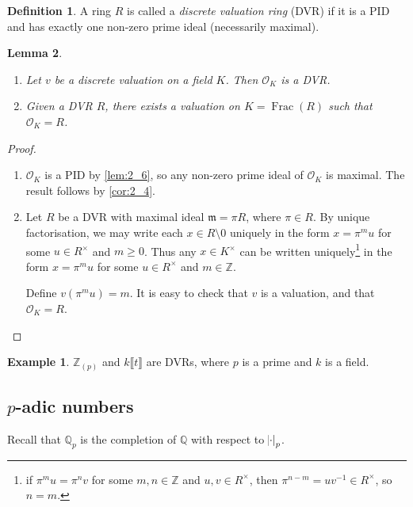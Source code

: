 \documentclass[11pt]{article}
\theoremstyle{definition}
\newtheorem{definition}{Definition}[subsection]
\newtheorem*{example}{Example}
\theoremstyle{plain}
\newtheorem{lemma}[definition]{Lemma}
\theoremstyle{remark}
\DeclareMathOperator{\Frac}{Frac}
\newcommand{\bZ}{\mathbb{Z}}
\newcommand{\bQ}{\mathbb{Q}}
\newcommand{\cO}{\mathcal{O}}
\newcommand{\fm}{\mathfrak{m}}
\begin{document}
\begin{definition}
    A ring $R$ is called a \emph{discrete valuation ring} (DVR) if it is a PID and has exactly one non-zero prime ideal (necessarily maximal).
\end{definition}

\begin{lemma}\label{lem:2_8}\phantom{}
    \begin{enumerate}
        \item Let $v$ be a discrete valuation on a field $K$. Then $\cO_K$ is a DVR.
        \item Given a DVR $R$, there exists a valuation on $K = \Frac(R)$ such that $\cO_K = R$.
    \end{enumerate}
\end{lemma}
\begin{proof}\phantom{}
    \begin{enumerate}
        \item $\cO_K$ is a PID by \autoref{lem:2_6}, so any non-zero prime ideal of $\cO_K$ is maximal. The result follows by \autoref{cor:2_4}.

        \item Let $R$ be a DVR with maximal ideal $\fm = \pi R$, where $\pi \in R$. By unique factorisation, we may write each $x \in R \setminus 0$ uniquely in the form $x = \pi^m u$ for some $u \in R^\times$ and $m \ge 0$. Thus any $x \in K^\times$ can be written uniquely\footnote{if $\pi^m u = \pi^n v$ for some $m, n \in \bZ$ and $u, v \in R^\times$, then $\pi^{n-m} = u v^{-1} \in R^\times$, so $n = m$.} in the form $x = \pi^m u$ for some $u \in R^\times$ and $m \in \bZ$.

        Define $v(\pi^m u) = m$. It is easy to check that $v$ is a valuation, and that $\cO_K = R$. \qedhere
    \end{enumerate}
\end{proof}

\begin{example}
    $\bZ_{(p)}$ and $k \llbracket t \rrbracket$ are DVRs, where $p$ is a prime and $k$ is a field.
\end{example}

\subsection{\texorpdfstring{$p$}{p}-adic numbers}

\noindent Recall that $\bQ_p$ is the completion of $\bQ$ with respect to $\abs{\cdot}_p$.
\end{document}
